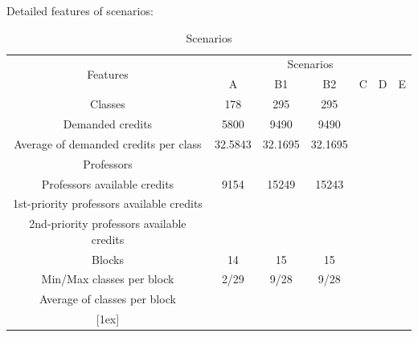 Detailed features of scenarios:
\begin{table}[ht]
\caption{Scenarios} 							%
\centering
\begin{tabular}{c | c c c c c c} 	%
\hline\hline 											%
\multirow{2}{*}{Features} &
	\multicolumn{6}{c}{Scenarios} \\
																				& A & B1 & B2 & C & D & E \\ [0.5ex] 						%
\hline 														%
Classes 																& 178	& 295	 & 295& & \\
Demanded credits 												& 5800	& 9490 & 9490& & \\
Average of demanded credits per class 	& 32.5843	& 32.1695	 & 32.1695& & \\
\hline
Professors 															& 	& 	 & & & \\
Professors available credits 						& 9154	& 15249	 & 15243& & \\
1st-priority professors available credits & 	& 	 & & & \\
2nd-priority professors available credits	& 	& 	 & & & \\
\hline
Blocks 																	& 14	& 15	 & 15& & \\
Min/Max classes per block 							& 2/29	& 9/28 & 9/28& & \\
Average of classes per block 						& 	& 	 & & & \\

 [1ex] 							%
\hline
\end{tabular}
\label{table:scenarios} 					%
\end{table}




